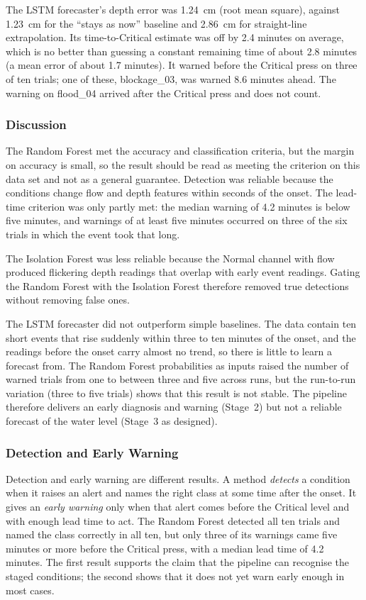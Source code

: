 \documentclass[12pt, a4paper]{article}
\begin{document}
The LSTM forecaster's depth error was 1.24~cm (root mean square), against 1.23~cm for the ``stays as now'' baseline and 2.86~cm for straight-line extrapolation. Its time-to-Critical estimate was off by 2.4 minutes on average, which is no better than guessing a constant remaining time of about 2.8 minutes (a mean error of about 1.7 minutes). It warned before the Critical press on three of ten trials; one of these, blockage\_03, was warned 8.6 minutes ahead. The warning on flood\_04 arrived after the Critical press and does not count.

\subsubsection{Discussion}

The Random Forest met the accuracy and classification criteria, but the margin on accuracy is small, so the result should be read as meeting the criterion on this data set and not as a general guarantee. Detection was reliable because the conditions change flow and depth features within seconds of the onset. The lead-time criterion was only partly met: the median warning of 4.2 minutes is below five minutes, and warnings of at least five minutes occurred on three of the six trials in which the event took that long.

The Isolation Forest was less reliable because the Normal channel with flow produced flickering depth readings that overlap with early event readings. Gating the Random Forest with the Isolation Forest therefore removed true detections without removing false ones.

The LSTM forecaster did not outperform simple baselines. The data contain ten short events that rise suddenly within three to ten minutes of the onset, and the readings before the onset carry almost no trend, so there is little to learn a forecast from. The Random Forest probabilities as inputs raised the number of warned trials from one to between three and five across runs, but the run-to-run variation (three to five trials) shows that this result is not stable. The pipeline therefore delivers an early diagnosis and warning (Stage~2) but not a reliable forecast of the water level (Stage~3 as designed).

\subsubsection{Detection and Early Warning}

Detection and early warning are different results. A method \emph{detects} a condition when it raises an alert and names the right class at some time after the onset. It gives an \emph{early warning} only when that alert comes before the Critical level and with enough lead time to act. The Random Forest detected all ten trials and named the class correctly in all ten, but only three of its warnings came five minutes or more before the Critical press, with a median lead time of 4.2 minutes. The first result supports the claim that the pipeline can recognise the staged conditions; the second shows that it does not yet warn early enough in most cases.
\end{document}
